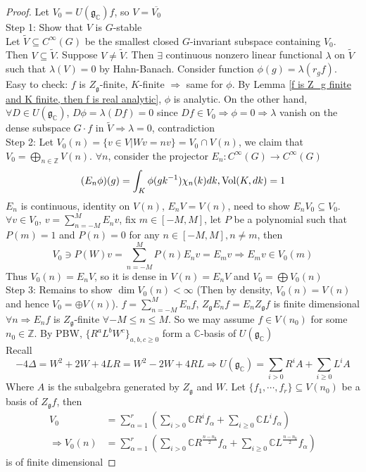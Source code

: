 \documentclass[main]{subfiles}
\begin{document}
\begin{proof}
Let $V_0=U(\mathfrak g_{\mathbb C})f$, so $V=\overline{V_0}$ \\
Step 1: Show that $V$ is $G$-stable \\
Let $\tilde V\subseteq C^\infty(G)$ be the smallest closed $G$-invariant subspace containing $V_0$. Then $V\subseteq\tilde V$. Suppose $V\neq\tilde V$. Then $\exists$ continuous nonzero linear functional $\lambda$ on $\tilde V$ such that $\lambda(V)=0$ by Hahn-Banach. Consider function $\phi(g)=\lambda(r_gf)$. Easy to check: $f$ is $Z_{\mathfrak g}$-finite, $K$-finite $\Rightarrow$ same for $\phi$. By Lemma \ref{f is Z_g finite and K finite, then f is real analytic}, $\phi$ is analytic. On the other hand, $\forall D\in U(\mathfrak g_{\mathbb C})$, $D\phi=\lambda(Df)=0$ since $Df\in V_0\Rightarrow\phi=0\Rightarrow\lambda$ vanish on the dense subspace $G\cdot f$ in $\tilde V\Rightarrow\lambda=0$, contradiction \\
Step 2: Let $V_0(n)=\{v\in V|Wv=nv\}=V_0\cap V(n)$, we claim that $V_0=\bigoplus_{n\in\mathbb Z}V(n)$. $\forall n$, consider the projector $E_n:C^\infty(G)\to C^\infty(G)$
\[(E_n\phi)(g)=\int_K\phi(gk^{-1})\chi_n(k)dk,\operatorname{Vol}(K,dk)=1\]
$E_n$ is continuous, identity on $V(n)$, $E_nV=V(n)$, need to show $E_nV_0\subseteq V_0$. $\forall v\in V_0$, $v=\sum_{n=-M}^ME_nv$, fix $m\in[-M,M]$, let $P$ be a polynomial such that $P(m)=1$ and $P(n)=0$ for any $n\in[-M,M],n\neq m$, then
\[V_0\ni P(W)v=\sum_{n=-M}^MP(n)E_nv=E_mv\Rightarrow E_mv\in V_0(m)\]
Thus $V_0(n)=E_nV$, so it is dense in $V(n)=E_nV$ and $V_0=\bigoplus V_0(n)$ \\
Step 3: Remains to show $\dim V_0(n)<\infty$ (Then by density, $V_0(n)=V(n)$ and hence $V_0=\oplus V(n)$). $f=\sum_{n=-M}^ME_nf$, $Z_{\mathfrak g}E_nf=E_nZ_{\mathfrak g}f$ is finite dimensional $\forall n\Rightarrow E_nf$ is $Z_{\mathfrak g}$-finite $\forall -M\leq n\leq M$. So we may assume $f\in V(n_0)$ for some $n_0\in\mathbb Z$. By PBW, $\{R^aL^bW^c\}_{a,b,c\geq0}$ form a $\mathbb C$-basis of $U(\mathfrak g_{\mathbb C})$ \\
Recall
\[-4\Delta=W^2+2W+4LR=W^2-2W+4RL\Rightarrow U(\mathfrak g_{\mathbb C})=\sum_{i>0}R^iA+\sum_{i\geq0}L^iA\]
Where $A$ is the subalgebra generated by $Z_{\mathfrak g}$ and $W$. Let $\{f_1,\cdots,f_r\}\subseteq V(n_0)$ be a basis of $Z_{\mathfrak g}f$, then
\begin{align*}
V_0&=\sum_{\alpha=1}^r\left(\sum_{i>0}\mathbb CR^if_\alpha+\sum_{i\geq0}\mathbb CL^if_\alpha\right) \\
\Rightarrow V_0(n)&=\sum_{\alpha=1}^r\left(\sum_{i>0}\mathbb CR^{\frac{n-n_0}{2}}f_\alpha+\sum_{i\geq0}\mathbb CL^{\frac{n-n_0}{2}}f_\alpha\right)
\end{align*}
is of finite dimensional
\end{proof}
\end{document}
